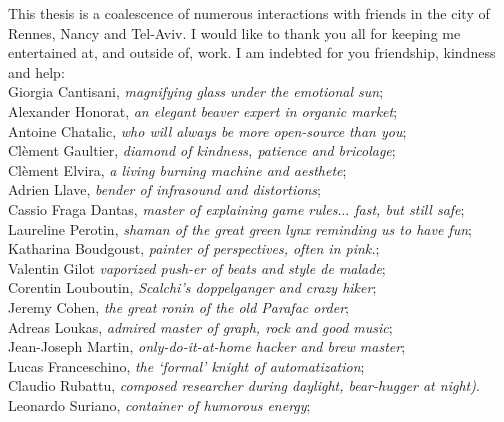 \mynewline
This thesis is a coalescence of numerous interactions with friends in the city of Rennes, Nancy and Tel-Aviv.
I would like to thank you all for keeping me entertained at, and outside of, work.
I am indebted for you friendship, kindness and help:{\small
\\\hspace*{0.3cm} Giorgia Cantisani, \textit{magnifying glass under the emotional sun};
\\\hspace*{0.3cm} Alexander Honorat, \textit{an elegant beaver expert in organic market};
\\\hspace*{0.3cm} Antoine Chatalic, \textit{who will always be more open-source than you};
\\\hspace*{0.3cm} Cl\`ement Gaultier, \textit{diamond of kindness, patience and bricolage};
\\\hspace*{0.3cm} Cl\`ement Elvira, \textit{a living burning machine and aesthete};
\\\hspace*{0.3cm} Adrien Llave, \textit{bender of infrasound and distortions};
\\\hspace*{0.3cm} Cassio Fraga Dantas, \textit{master of explaining game rules$\ldots$ fast, but still safe};
\\\hspace*{0.3cm} Laureline Perotin, \textit{shaman of the great green lynx reminding us to have fun};
\\\hspace*{0.3cm} Katharina Boudgoust, \textit{painter of perspectives, often in pink.};
\\\hspace*{0.3cm} Valentin Gilot \textit{vaporized push-er of beats and style de malade};
\\\hspace*{0.3cm} Corentin Louboutin, \textit{Scalchi's doppelganger and crazy hiker};
\\\hspace*{0.3cm} Jeremy Cohen, \textit{the great ronin of the old Parafac order};
\\\hspace*{0.3cm} Adreas Loukas, \textit{admired master of graph, rock and good music};
\\\hspace*{0.3cm} Jean-Joseph Martin, \textit{only-do-it-at-home hacker and brew master};
\\\hspace*{0.3cm} Lucas Franceschino, \textit{the `formal' knight of automatization};
\\\hspace*{0.3cm} Claudio Rubattu, \textit{composed researcher during daylight, bear-hugger at night)}.
\\\hspace*{0.3cm} Leonardo Suriano, \textit{container of humorous energy};
}
